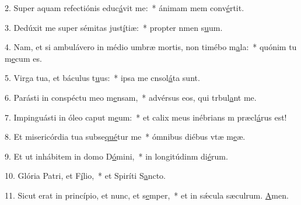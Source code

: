 2. Super aquam refectiónis educ\uline{á}vit me:~* ánimam mem conv\uline{é}rtit.\par 
3. Dedúxit me super sémitas just\uline{í}tiæ:~* propter nmen s\uline{u}um.\par 
4. Nam, et si ambulávero in médio umbræ mortis, non timébo m\uline{a}la:~* quónim tu m\uline{e}cum es.\par 
5. Virga tua, et báculus t\uline{u}us:~* ipsa me cnsol\uline{á}ta sunt.\par 
6. Parásti in conspéctu meo m\uline{e}nsam,~* advérsus eos, qui trbul\uline{a}nt me.\par 
7. Impinguásti in óleo caput m\uline{e}um:~* et calix meus inébrians m præcl\uline{á}rus est!\par 
8. Et misericórdia tua subse\uline{qué}tur me~* ómnibus diébus vtæ m\uline{e}æ.\par 
9. Et ut inhábitem in domo D\uline{ó}mini,~* in longitúdinm di\uline{é}rum.\par 
10. Glória Patri, et F\uline{í}lio,~* et Spiríti S\uline{a}ncto.\par 
11. Sicut erat in princípio, et nunc, et s\uline{e}mper,~* et in sǽcula sæculrum. \uline{A}men.\par 
